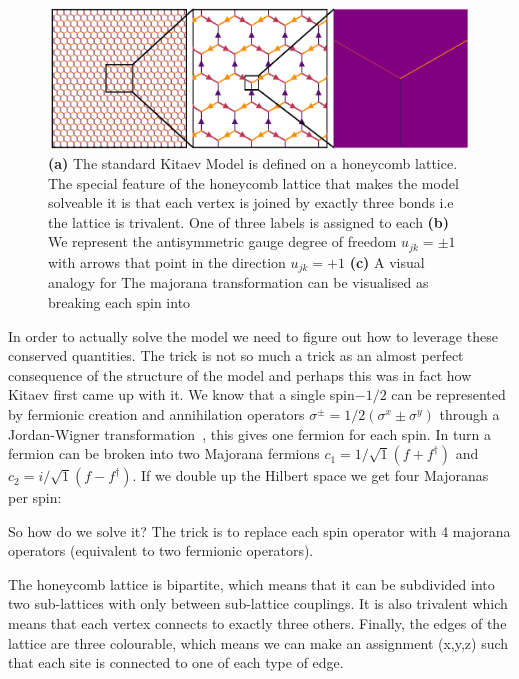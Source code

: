 \begin{figure}
    \centering
    \includegraphics[width=\columnwidth]{figure_code/amk_chapter/honeycomb_zoom/intro_figure_template}
    \caption{\textbf{(a)} The standard Kitaev Model is defined on a honeycomb lattice. The special feature of the honeycomb lattice that makes the model solveable it is that each vertex is joined by exactly three bonds i.e the lattice is trivalent. One of three labels is assigned to each \textbf{(b)} We represent the antisymmetric gauge degree of freedom $u_{jk} = \pm 1$ with arrows that point in the direction $u_{jk} = +1$ \textbf{(c)} A visual analogy for The majorana transformation can be visualised as breaking each spin into}
    \label{fig:honeycomb_zoom}
\end{figure}

In order to actually solve the model we need to figure out how to leverage these conserved quantities. The trick is not so much a trick as an almost perfect consequence of the structure of the model and perhaps this was in fact how Kitaev first came up with it. We know that a single spin$-1/2$ can be represented by fermionic creation and annihilation operators $\sigma^{\pm} = 1/2(\sigma^x \pm \sigma^y)$ through a Jordan-Wigner transformation~\cite{}, this gives one fermion for each spin. In turn a fermion can be broken into two Majorana fermions $c_1 = 1/\sqrt{1}(f + f^\dagger)$ and $c_2 = i/\sqrt{1}(f - f^\dagger)$. If we double up the Hilbert space we get four Majoranas per spin: 

So how do we solve it? The trick is to replace each spin operator with 4 majorana operators (equivalent to two fermionic operators). 
 
The honeycomb lattice is bipartite, which means that it can be subdivided into two sub-lattices with only between sub-lattice couplings. It is also trivalent which means that each vertex connects to exactly three others. Finally, the edges of the lattice are three colourable, which means we can make an assignment (x,y,z) such that each site is connected to one of each type of edge. 

